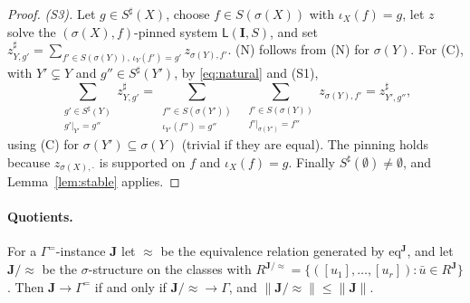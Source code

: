 \documentclass[11pt]{article}
\theoremstyle{definition}
\theoremstyle{remark}
\newcommand{\eqrel}{\mathrm{eq}}
\newcommand{\size}[1]{\lVert #1\rVert}
\begin{document}
\begin{proof}
\emph{(S3).} Let $g\in S^\sharp(X)$, choose $f\in S(\sigma(X))$ with
$\iota_X(f)=g$, let $z$ solve the $(\sigma(X),f)$-pinned system
$\mathsf L(\mathbf I,S)$, and set
$z^\sharp_{Y,g'}=\sum_{f'\in S(\sigma(Y)),\,\iota_Y(f')=g'}z_{\sigma(Y),f'}$.
(N) follows from (N) for $\sigma(Y)$. For (C), with $Y'\subsetneq Y$ and
$g''\in S^\sharp(Y')$, by \eqref{eq:natural} and (S1),
\[
\sum_{\substack{g'\in S^\sharp(Y)\\ g'|_{Y'}=g''}} z^\sharp_{Y,g'}
=\sum_{\substack{f''\in S(\sigma(Y'))\\ \iota_{Y'}(f'')=g''}}\ \
 \sum_{\substack{f'\in S(\sigma(Y))\\ f'|_{\sigma(Y')}=f''}} z_{\sigma(Y),f'}
=z^\sharp_{Y',g''},
\]
using (C) for $\sigma(Y')\subseteq\sigma(Y)$ (trivial if they are equal). The
pinning holds because $z_{\sigma(X),\cdot}$ is supported on $f$ and
$\iota_X(f)=g$. Finally $S^\sharp(\emptyset)\ne\emptyset$, and
Lemma~\ref{lem:stable} applies.
\end{proof}

\paragraph{Quotients.} For a $\Gamma^{=}$-instance $\mathbf J$ let $\approx$
be the equivalence relation generated by $\eqrel^{\mathbf J}$, and let
$\mathbf J/{\approx}$ be the $\sigma$-structure on the classes with
$R^{\mathbf J/\approx}=\{([u_1],\dots,[u_r]):\bar u\in R^{\mathbf J}\}$. Then
$\mathbf J\to\Gamma^{=}$ if and only if $\mathbf J/{\approx}\to\Gamma$, and
$\size{\mathbf J/{\approx}}\le\size{\mathbf J}$.
\end{document}
